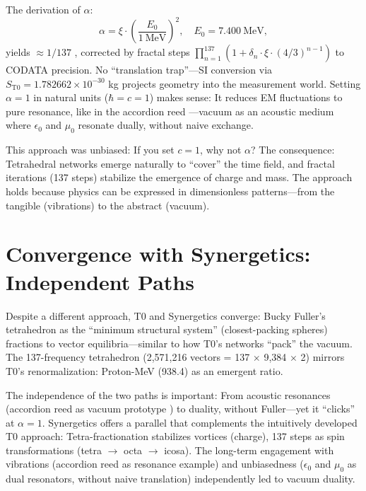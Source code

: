 	The derivation of $\alpha$:
	\begin{equation}
		\alpha = \xi \cdot \left( \frac{E_0}{1\ \mathrm{MeV}} \right)^2, \quad E_0 = 7.400\ \mathrm{MeV},
	\end{equation}
	yields $\approx 1/137$ \cite{codata2022}, corrected by fractal steps $\prod_{n=1}^{137} (1 + \delta_n \cdot \xi \cdot (4/3)^{n-1})$ to CODATA precision. No ``translation trap''—SI conversion via $S_{\mathrm{T0}} = 1.782662 \times 10^{-30}$ kg projects geometry into the measurement world. Setting $\alpha = 1$ in natural units ($\hbar = c = 1$) makes sense: It reduces EM fluctuations to pure resonance, like in the accordion reed \cite{ricot2005}—vacuum as an acoustic medium where $\epsilon_0$ and $\mu_0$ resonate dually, without naive exchange.
	
	This approach was unbiased: If you set $c = 1$, why not $\alpha$? The consequence: Tetrahedral networks emerge naturally to ``cover'' the time field, and fractal iterations (137 steps) stabilize the emergence of charge and mass. The approach holds because physics can be expressed in dimensionless patterns—from the tangible (vibrations) to the abstract (vacuum).
	
	\section{Convergence with Synergetics: Independent Paths}
	Despite a different approach, T0 and Synergetics converge: Bucky Fuller's tetrahedron as the ``minimum structural system'' \cite{fuller1975} (closest-packing spheres) fractions to vector equilibria—similar to how T0's networks ``pack'' the vacuum. The 137-frequency tetrahedron (2,571,216 vectors = 137 $\times$ 9,384 $\times$ 2) mirrors T0's renormalization: Proton-MeV (938.4) as an emergent ratio.
	
	The independence of the two paths is important: From acoustic resonances (accordion reed as vacuum prototype \cite{ricot2005}) to duality, without Fuller—yet it ``clicks'' at $\alpha=1$. Synergetics offers a parallel that complements the intuitively developed T0 approach: Tetra-fractionation stabilizes vortices (charge), 137 steps as spin transformations (tetra $\to$ octa $\to$ icosa). The long-term engagement with vibrations (accordion reed as resonance example) and unbiasedness ($\epsilon_0$ and $\mu_0$ as dual resonators, without naive translation) independently led to vacuum duality.
	
